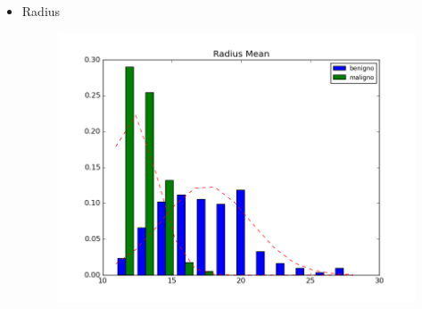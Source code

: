 \documentclass[11pt,a4paper]{article}
\numberwithin{equation}{section}
\begin{document}
\begin{itemize}
\item Radius
\begin{figure}[H]
\centering
  \includegraphics[width=.5\linewidth]{../img/hist/radius_mean}
  \label{fig:test1}
\end{figure}%


\end{itemize}
\end{document}
